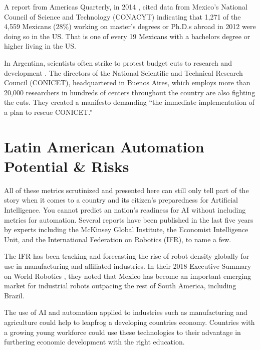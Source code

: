 \documentclass[conference]{IEEEtran}
\begin{document}
A report from Americas Quarterly, in 2014 \cite{velasco2014academic}, cited data from Mexico's National Council of Science and Technology (CONACYT) indicating that 1,271 of the 4,559 Mexicans (28\%) working on master's degrees or Ph.D.s abroad in 2012 were doing so in the US. That is one of every 19 Mexicans with a bachelors degree or higher living in the US.

In Argentina, scientists often strike to protest budget cuts to research and development \cite{debat2019plan}. The directors of the National Scientific and Technical Research Council (CONICET), headquartered in Buenos Aires, which employs more than 20,000 researchers in hundreds of centers throughout the country are also fighting the cuts. They created a manifesto demanding ``the immediate implementation of a plan to rescue CONICET.''


\section{Latin American Automation Potential \& Risks}

All of these metrics scrutinized and presented here can still only tell part of the story when it comes to a country and its citizen's preparedness for Artificial Intelligence. You cannot predict an nation's readiness for AI without including metrics for automation. Several reports have been published in the last five years by experts including the McKinsey Global Institute, the Economist Intelligence Unit, and the International Federation on Robotics (IFR), to name a few.

The IFR has been tracking and forecasting the rise of robot density globally for use in manufacturing and affiliated industries. In their 2018 Executive Summary on World Robotics \cite{robotics2016executive}, they noted that Mexico has become an important emerging market for industrial robots outpacing the rest of South America, including Brazil.

The use of AI and automation applied to industries such as manufacturing and agriculture could help to leapfrog a developing countries economy. Countries with a growing young workforce could use these technologies to their advantage in furthering economic development with the right education.
\end{document}
